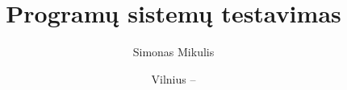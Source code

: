 \documentclass{VUMIFPSkursinis}
\title{Programų sistemų testavimas}
\author{Simonas Mikulis}
\date{Vilnius – \the\year}
\begin{document}
    
    \newenvironment{innerParagraph}
    {\begin{adjustwidth}{0.5cm}{}}
    {\\\end{adjustwidth}}
  
    \maketitle
    \tableofcontents
      
    
    
    
    
  
\end{document}
